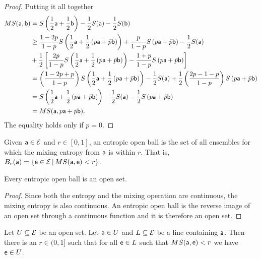 \begin{proof}
	Putting it all together
	\begin{equation}
		\begin{aligned}
			MS(\ens[a],\ens[b]) &= S\left(\frac{1}{2} \ens[a] + \frac{1}{2} \ens[b]\right)- \frac{1}{2} S(\ens[a]) - \frac{1}{2} S(\ens[b]) \\
			&\geq \frac{1-2p}{1-p}S\left(\frac{1}{2} \ens[a] + \frac{1}{2}\left(p\ens[a] + \bar{p} \ens[b]\right)\right) + \frac{p}{1-p} S\left(p\ens[a] + \bar{p} \ens[b]\right) - \frac{1}{2} S(\ens[a]) \\
			&+ \frac{1}{2}\left[\frac{2p}{1-p} S\left(\frac{1}{2} \ens[a] + \frac{1}{2}\left(p\ens[a] + \bar{p} \ens[b]\right)\right) - \frac{1+p}{1-p} S\left(p \ens[a] + \bar{p} \ens[b] \right)\right] \\
			&= \left(\frac{1-2p + p}{1-p}\right)S\left(\frac{1}{2} \ens[a] + \frac{1}{2}\left(p\ens[a] + \bar{p} \ens[b]\right)\right) - \frac{1}{2} S(\ens[a]) + \frac{1}{2}\left(\frac{2p-1-p}{1-p}\right) S\left(p\ens[a] + \bar{p} \ens[b]\right) \\
			&= S\left(\frac{1}{2} \ens[a] + \frac{1}{2}\left(p\ens[a] + \bar{p} \ens[b]\right)\right) - \frac{1}{2} S(\ens[a]) - \frac{1}{2} S\left(p\ens[a] + \bar{p} \ens[b]\right) \\
			&= MS(\ens[a], p\ens[a] + \bar{p} \ens[b]).
		\end{aligned}
	\end{equation}
	The equality holds only if $p=0$.
\end{proof}

\begin{defn}
	Given $\ens[a] \in \Ens$ and $r \in [0,1]$, an entropic open ball is the set of all ensembles for which the mixing entropy from $\ens[a]$ is within $r$. That is, $B_r(\ens[a]) = \{\ens \in \Ens \, | \, MS(\ens[a], \ens) < r\}$.
\end{defn}

\begin{coro}
	Every entropic open ball is an open set.
\end{coro}

\begin{proof}
	Since both the entropy and the mixing operation are continuous, the mixing entropy is also continuous. An entropic open ball is the reverse image of an open set through a continuous function and it is therefore an open set.
\end{proof}

\begin{prop}
	Let $U \subseteq \Ens$ be an open set. Let $\ens[a] \in U$ and $L \subseteq \Ens$ be a line containing $\ens[a]$. Then there is an $r \in (0,1]$ such that for all $\ens \in L$ such that $MS(\ens[a], \ens) < r$ we have $\ens \in U$.
\end{prop}

